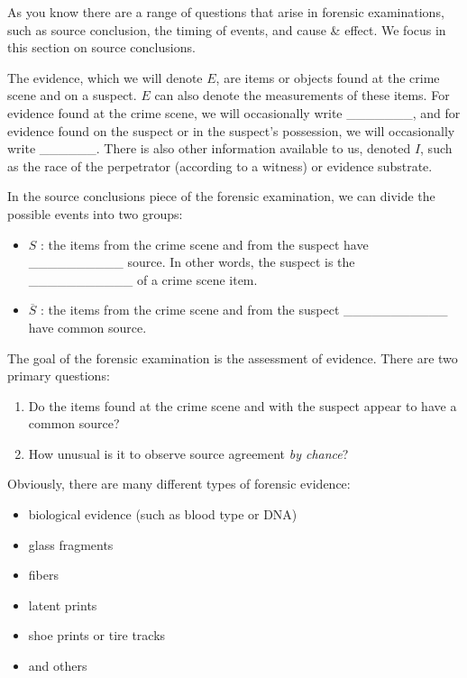 \documentclass[]{book}
\providecommand{\tightlist}{%
  \setlength{\itemsep}{0pt}\setlength{\parskip}{0pt}}
\theoremstyle{definition}
\theoremstyle{definition}
\theoremstyle{remark}
\begin{document}
As you know there are a range of questions that arise in forensic
examinations, such as source conclusion, the timing of events, and cause
\& effect. We focus in this section on source conclusions.

The evidence, which we will denote \(E\), are items or objects found at
the crime scene and on a suspect. \(E\) can also denote the measurements
of these items. For evidence found at the crime scene, we will
occasionally write \_\_\_\_\_\_\_, and for evidence found on the suspect
or in the suspect's possession, we will occasionally write \_\_\_\_\_\_.
There is also other information available to us, denoted \(I\), such as
the race of the perpetrator (according to a witness) or evidence
substrate.

In the source conclusions piece of the forensic examination, we can
divide the possible events into two groups:

\begin{itemize}
\tightlist
\item
  \(S\) : the items from the crime scene and from the suspect have
  \_\_\_\_\_\_\_\_\_\_ source. In other words, the suspect is the
  \_\_\_\_\_\_\_\_\_\_\_ of a crime scene item. \vspace{.1in}
\item
  \(\overline{S}\) : the items from the crime scene and from the suspect
  \_\_\_\_\_\_\_\_\_\_\_ have common source.
\end{itemize}

The goal of the forensic examination is the assessment of evidence.
There are two primary questions:

\begin{enumerate}
\def\labelenumi{\arabic{enumi}.}
\tightlist
\item
  Do the items found at the crime scene and with the suspect appear to
  have a common source?
\item
  How unusual is it to observe source agreement \emph{by chance}?
\end{enumerate}

Obviously, there are many different types of forensic evidence:

\begin{itemize}
\tightlist
\item
  biological evidence (such as blood type or DNA)
\item
  glass fragments
\item
  fibers
\item
  latent prints
\item
  shoe prints or tire tracks
\item
  and others
\end{itemize}
\end{document}
